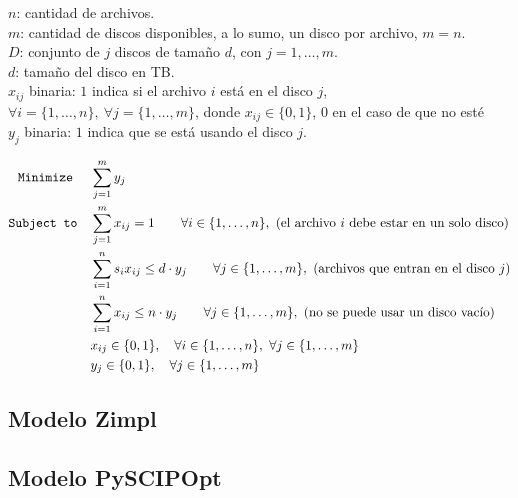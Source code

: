 \documentclass[11pt, a4paper, pdftex]{article}
\begin{document}
$n$: cantidad de archivos. \\

$m$: cantidad de discos disponibles, a lo sumo, un disco por archivo, $m = n$. \\

$D$: conjunto de $j$ discos de tamaño $d$, con $j = 1, \ldots, m$. \\

$d$: tamaño del disco en TB. \\ 

$x_{ij}$ binaria: $1$ indica si el archivo $i$ está en el disco $j$, $\forall i = \{1, \ldots, n\},\ \forall j = \{1, \ldots, m\}$, donde $x_{ij} \in \{0, 1\}$, $0$ en el caso de que no esté\\

$y_{j}$ binaria: $1$ indica que se está usando el disco $j$.

\begin{alignat*}{2}
	\minimize
	& \sum_{j = 1}^{m} y_{j}\\
	\subjto
	& \sum_{j = 1}^{m} x_{ij} = 1 \qquad \forall i \in \{1, \ldots, n\},\ \text{(el archivo $i$ debe estar en un solo disco)}\\
	& \sum_{i = 1}^{n} s_{i} x_{ij} \le d\cdot y_{j} \qquad \forall j \in \{1, \ldots, m\},\ \text{(archivos que entran en el disco $j$)}\\
	& \sum_{i = 1}^{n} x_{ij} \le n\cdot y_{j} \qquad \forall j \in \{1, \ldots, m\},\ \text{(no se puede usar un disco vacío)}\\
	& x_{ij} \in \{0,1\}, \quad \forall i \in \{1, \ldots, n\}, \ \forall j \in \{1, \ldots, m\}\\
	& y_{j} \in \{0,1\}, \quad \forall j \in \{1, \ldots, m\}
\end{alignat*}

\newpage
\subsection{Modelo Zimpl}



\newpage
\subsection{Modelo PySCIPOpt}

%
\end{document}
